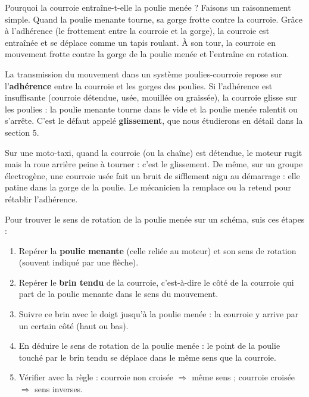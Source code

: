 \documentclass[11pt]{article}
\newcommand{\cle}[1]{{\popxbold\color{popdark}#1}}
\begin{document}
Pourquoi la courroie entraîne-t-elle la poulie menée ? Faisons un raisonnement simple. Quand la poulie menante tourne, sa gorge frotte contre la courroie. Grâce à l'\cle{adhérence} (le frottement entre la courroie et la gorge), la courroie est entraînée et se déplace comme un tapis roulant. À son tour, la courroie en mouvement frotte contre la gorge de la poulie menée et l'entraîne en rotation.

\begin{aretenir}
La transmission du mouvement dans un système poulies-courroie repose sur l'\textbf{adhérence} entre la courroie et les gorges des poulies. Si l'adhérence est insuffisante (courroie détendue, usée, mouillée ou graissée), la courroie \cle{glisse} sur les poulies : la poulie menante tourne \og dans le vide \fg{} et la poulie menée ralentit ou s'arrête. C'est le défaut appelé \textbf{glissement}, que nous étudierons en détail dans la section 5.
\end{aretenir}

\begin{savaistu}
Sur une moto-taxi, quand la courroie (ou la chaîne) est détendue, le moteur rugit mais la roue arrière peine à tourner : c'est le glissement. De même, sur un groupe électrogène, une courroie usée fait un bruit de sifflement aigu au démarrage : elle patine dans la gorge de la poulie. Le mécanicien la remplace ou la retend pour rétablir l'adhérence.
\end{savaistu}

\begin{methode}
Pour trouver le sens de rotation de la poulie menée sur un schéma, suis ces étapes :
\begin{enumerate}
\item Repérer la \textbf{poulie menante} (celle reliée au moteur) et son sens de rotation (souvent indiqué par une flèche).
\item Repérer le \textbf{brin tendu} de la courroie, c'est-à-dire le côté de la courroie qui part de la poulie menante dans le sens du mouvement.
\item Suivre ce brin avec le doigt jusqu'à la poulie menée : la courroie y arrive par un certain côté (haut ou bas).
\item En déduire le sens de rotation de la poulie menée : le point de la poulie touché par le brin tendu se déplace dans le même sens que la courroie.
\item Vérifier avec la règle : courroie non croisée $\Rightarrow$ même sens ; courroie croisée $\Rightarrow$ sens inverses.
\end{enumerate}
\end{methode}
\end{document}
